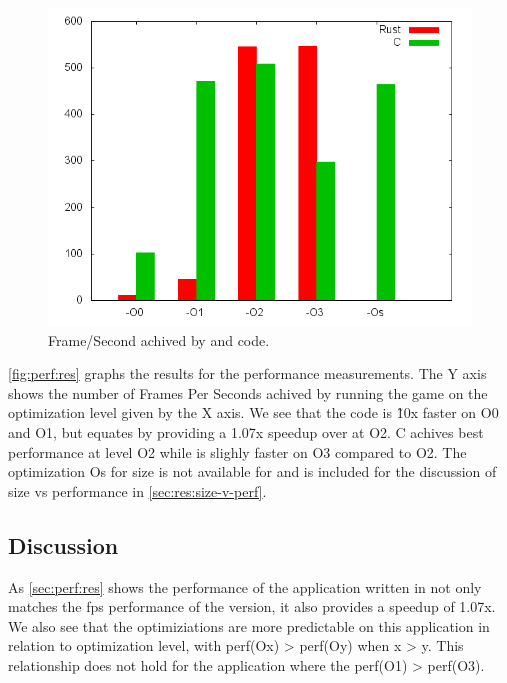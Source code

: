 \begin{figure}[H]
  \begin{center}
    \includegraphics[scale=0.5]{results/plots/perf/perf.png}
  \end{center}
  \caption{Frame/Second achived by {\C} and {\rust} code.}
  \label{fig:perf:res}
\end{figure}

\autoref{fig:perf:res} graphs the results for the performance measurements.
The Y axis shows the number of Frames Per Seconds achived by running the game on the optimization level given by the X axis.
We see that the {\C} code is \~10x faster on O0 and O1, but {\rust} equates by providing a 1.07x speedup over {\C} at O2.
C achives best performance at level O2 while {\rust} is slighly faster on O3 compared to O2.
The optimization Os for size is not available for {\rust} and is included for the discussion of size vs performance in \autoref{sec:res:size-v-perf}.

\subsection{Discussion}
\label{sec:perf:disc}
As \autoref{sec:perf:res} shows the performance of the application written in {\rust} not only matches the \gls{fps} performance of the {\C} version, it also provides a speedup of 1.07x.
We also see that the optimiziations are more predictable on this application in relation to optimization level, with perf(Ox) > perf(Oy) when x > y.
This relationship does not hold for the {\C} application where the perf(O1) > perf(O3).
